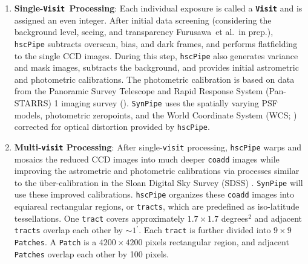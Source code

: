 \documentclass[useamsfonts]{pasj01}
\def\amin{$^\prime$}
\def\etal{{\ et al.~}}
\def\hscpipe{\texttt{hscPipe}}
\def\synpipe{\texttt{SynPipe}}
\def\coadd{\texttt{coadd}}
\def\tract{\texttt{tract}}
\def\visit{\texttt{visit}}
\def\tracts{\texttt{tracts}}
\newcommand{\term}[1]{\textbf{\texttt{#1}}}
\begin{document}
    \begin{enumerate}

        \item \textbf{Single-\texttt{Visit~}Processing}:
            Each individual exposure is called a \term{Visit} and is assigned
            an even integer.
            After initial data screening (considering the background level, seeing, 
            and transparency Furusawa\etal in prep.), \hscpipe{} subtracts overscan, 
            bias, and dark frames, and performs flatfielding to the single CCD images.
            During this step, \hscpipe{} also generates variance and mask images, 
            subtracts the background, and provides initial astrometric and photometric
            calibrations. 
            The photometric calibration is based on data from the Panoramic Survey 
            Telescope and Rapid Response System (Pan-STARRS) 1 imaging survey 
            (\citealt{Schlafly2012, Tonry2012, Magnier2013}).
            \synpipe{} uses the spatially varying PSF models, photometric zeropoints, 
            and the World Coordinate System (WCS; \citealt{WCS1, WCS2})
            corrected for optical distortion provided by \hscpipe{}.
            
        \item \textbf{Multi-\visit{} Processing}:
            After single-\visit{} processing, \hscpipe{} warps and mosaics the
            reduced CCD images into much deeper \coadd{} images while improving
            the astrometric and photometric calibrations via processes similar to
            the \"{u}ber-calibration in the Sloan Digital Sky Survey (SDSS)
            \citep{Padmanabhan2008}.
            \synpipe{} will use these improved calibrations.
            \hscpipe{} organizes these \coadd{} images into equiareal rectangular
            regions, or \tracts{}, which are predefined as iso-latitude tessellations.
            One \tract{} covers approximately $1.7\times 1.7$ degrees$^2$ and
            adjacent \tracts{} overlap each other by ${\sim}1$\amin{}.
            Each \tract{} is further divided into $9\times9$ \texttt{Patches}.
            A \texttt{Patch} is a $4200\times4200$ pixels rectangular region, and
            adjacent \texttt{Patches} overlap each other by 100 pixels.   
            

\end{enumerate}
\end{document}
